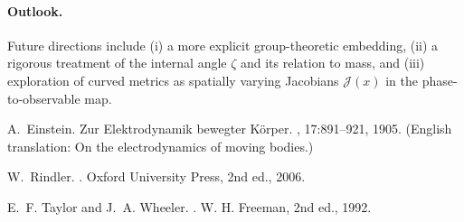 \documentclass[11pt]{article}
\numberwithin{equation}{section}
\begin{document}
\paragraph{Outlook.} Future directions include (i) a more explicit group-theoretic embedding, (ii) a rigorous treatment of the internal angle $\zeta$ and its relation to mass, and (iii) exploration of curved metrics as spatially varying Jacobians $\mathcal{J}(x)$ in the phase-to-observable map.


\begin{thebibliography}{9}

A.~Einstein.
\newblock Zur Elektrodynamik bewegter K\"{o}rper.
, 17:891--921, 1905.
(English translation: On the electrodynamics of moving bodies.)

W.~Rindler.
.
\newblock Oxford University Press, 2nd ed., 2006.

E.~F. Taylor and J.~A. Wheeler.
.
\newblock W. H. Freeman, 2nd ed., 1992.

\end{thebibliography}
\end{document}

